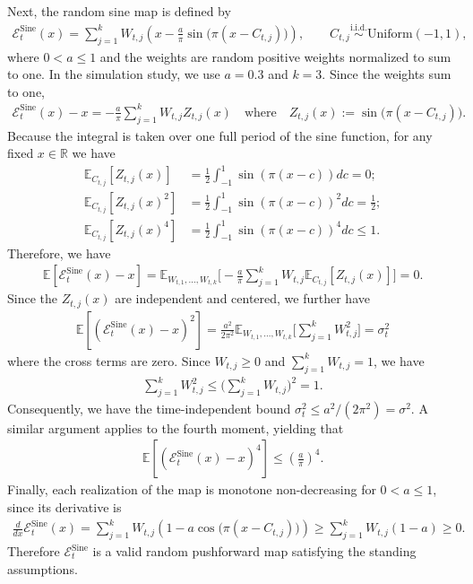 \documentclass[a4paper, 11pt]{article}
\newcommand{\R}{\mathbb{R}}
\newcommand{\E}{\mathbb E}
\newcommand{\T}{\mathcal E}
\theoremstyle{definition}
\begin{document}
Next, the random sine map is defined by
\begin{align}
    \T_t^{\mathrm{Sine}}(x) = \sum_{j=1}^k W_{t,j} \left( x-\frac{a}{\pi}\sin\bigl(\pi(x-C_{t,j})\bigr) \right), \qquad C_{t,j}\overset{\mathrm{i.i.d.}}{\sim}\mathrm{Uniform}(-1,1),
\end{align}
where $0 < a \leq 1$ and the weights are random positive weights normalized to sum to one. 
In the simulation study, we use $a=0.3$ and $k=3$.
Since the weights sum to one,
\begin{align}
    \T_t^{\mathrm{Sine}}(x) -  x = -\frac{a}{\pi} \sum_{j=1}^k W_{t,j} Z_{t,j}(x) \quad \text{where} \quad Z_{t,j}(x) := \sin\bigl(\pi(x-C_{t,j})\bigr).
\end{align}
Because the integral is taken over one full period of the sine function, for any fixed $x\in\R$ we have
\begin{align}
    \E_{C_{t,j}}[ Z_{t,j}(x) ] & = \frac{1}{2} \int_{-1}^{1}\sin( \pi(x-c) )dc = 0; \\
    \E_{C_{t,j}}[ Z_{t,j}(x)^2 ] & = \frac{1}{2} \int_{-1}^{1}\sin( \pi(x-c) )^2 dc = \frac{1}{2}; \\
    \E_{C_{t,j}}[ Z_{t,j}(x)^4 ] & = \frac{1}{2} \int_{-1}^{1}\sin( \pi(x-c) )^4 dc \le 1 .
\end{align}
Therefore, we have
\begin{align}
    \E\left[ \T_t^{\mathrm{Sine}}(x) - x \right] = \E_{W_{t,1}, \dots, W_{t,k}}\bigg[ -\frac{a}{\pi} \sum_{j=1}^k W_{t,j} \E_{C_{t,j}}[ Z_{t,j}(x) ] \bigg] = 0 .
\end{align}
Since the $Z_{t,j}(x)$ are independent and centered, we further have
\begin{align}
    \E\left[ \left( \T_t^{\mathrm{Sine}}(x) - x \right)^2 \right] = \frac{a^2}{2\pi^2} \E_{W_{t,1}, \dots, W_{t,k}}\bigg[ \sum_{j=1}^k W_{t,j}^2 \bigg] = \sigma_t^2
\end{align}
where the cross terms are zero.
Since $W_{t,j}\geq 0$ and $\sum_{j=1}^k W_{t,j} = 1$, we have 
\begin{align}
    \sum_{j=1}^k W_{t,j}^2 \leq \bigg( \sum_{j=1}^k W_{t,j} \bigg)^2 = 1 .
\end{align}
Consequently, we have the time-independent bound $\sigma_t^2 \le a^2 / (2\pi^2) = \sigma^2$.
A similar argument applies to the fourth moment, yielding that
\begin{align}
    \E\left[ \left( \T_t^{\mathrm{Sine}}(x) - x \right)^4 \right] \le \left( \frac{a}{\pi} \right)^4 .
\end{align}
Finally, each realization of the map is monotone non-decreasing for $0 < a\leq 1$, since its derivative is
\begin{align}
    \frac{d}{dx}\T_t^{\mathrm{Sine}}(x)= \sum_{j=1}^k W_{t,j} \left( 1 - a \cos\bigl(\pi(x-C_{t,j})\bigr) \right) \geq \sum_{j=1}^k W_{t,j} ( 1 - a ) \geq 0 .
\end{align}
Therefore $\T_t^{\mathrm{Sine}}$ is a valid random pushforward map satisfying the standing assumptions.
\end{document}
